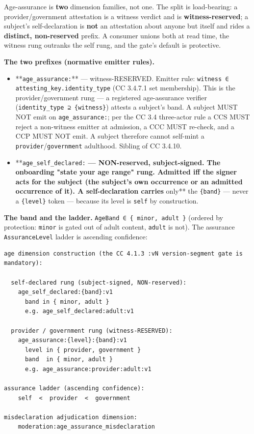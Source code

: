 \documentclass[11pt]{article}
\begin{document}
Age-assurance is \textbf{two} dimension families, not one. The split is load-bearing: a provider/government attestation is a witness verdict and is \textbf{witness-reserved}; a subject's self-declaration is \textbf{not} an attestation about anyone but itself and rides a \textbf{distinct, non-reserved} prefix. A consumer unions both at read time, the witness rung outranks the self rung, and the gate's default is protective.


\textbf{The two prefixes (normative emitter rules).}


\begin{itemize}\setlength\itemsep{0pt}
\item **\texttt{age\_assurance:}** — witness-RESERVED. Emitter rule: \texttt{witness ∈ attesting\_key.identity\_type} (CC 3.4.7.1 set membership). This is the provider/government rung — a registered age-assurance verifier (\texttt{identity\_type ⊇ \{witness\}}) attests a subject's band. A subject MUST NOT emit on \texttt{age\_assurance:}; per the CC 3.4 three-actor rule a CCS MUST reject a non-witness emitter at admission, a CCC MUST re-check, and a CCP MUST NOT emit. A subject therefore cannot self-mint a \texttt{provider}/\texttt{government} adulthood. Sibling of CC 3.4.10.
\item **\texttt{age\_self\_declared:}\textbf{ — NON-reserved, subject-signed. The onboarding "state your age range" rung. Admitted iff the signer acts for the subject (the subject's own occurrence or an admitted occurrence of it). A self-declaration carries }only** the \texttt{\{band\}} — never a \texttt{\{level\}} token — because its level is \texttt{self} by construction.
\end{itemize}


\textbf{The band and the ladder.} \texttt{AgeBand ∈ \{ minor, adult \}} (ordered by protection: \texttt{minor} is gated out of adult content, \texttt{adult} is not). The assurance \texttt{AssuranceLevel} ladder is ascending confidence:


\begin{lstlisting}
age dimension construction (the CC 4.1.3 :vN version-segment gate is mandatory):

  self-declared rung (subject-signed, NON-reserved):
    age_self_declared:{band}:v1
      band in { minor, adult }
      e.g. age_self_declared:adult:v1

  provider / government rung (witness-RESERVED):
    age_assurance:{level}:{band}:v1
      level in { provider, government }
      band  in { minor, adult }
      e.g. age_assurance:provider:adult:v1

assurance ladder (ascending confidence):
    self  <  provider  <  government

misdeclaration adjudication dimension:
    moderation:age_assurance_misdeclaration
\end{lstlisting}
\end{document}
